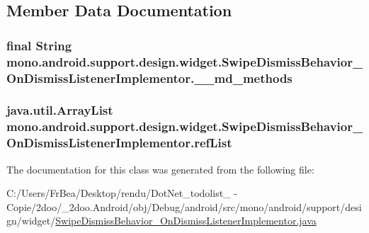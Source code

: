 \subsection{Member Data Documentation}
\hypertarget{classmono_1_1android_1_1support_1_1design_1_1widget_1_1_swipe_dismiss_behavior___on_dismiss_listener_implementor_74474e8db31efe7e1470f76275367cfe}{
\subsubsection[{\_\-\_\-md\_\-methods}]{\setlength{\rightskip}{0pt plus 5cm}final String {\bf mono.android.support.design.widget.SwipeDismissBehavior\_\-OnDismissListenerImplementor.\_\-\_\-md\_\-methods}}}
\label{classmono_1_1android_1_1support_1_1design_1_1widget_1_1_swipe_dismiss_behavior___on_dismiss_listener_implementor_74474e8db31efe7e1470f76275367cfe}


\hypertarget{classmono_1_1android_1_1support_1_1design_1_1widget_1_1_swipe_dismiss_behavior___on_dismiss_listener_implementor_38e4dd7bc6849d5a28ccc23f910a3dd5}{
\subsubsection[{refList}]{\setlength{\rightskip}{0pt plus 5cm}java.util.ArrayList {\bf mono.android.support.design.widget.SwipeDismissBehavior\_\-OnDismissListenerImplementor.refList}}}
\label{classmono_1_1android_1_1support_1_1design_1_1widget_1_1_swipe_dismiss_behavior___on_dismiss_listener_implementor_38e4dd7bc6849d5a28ccc23f910a3dd5}




The documentation for this class was generated from the following file:\begin{CompactItemize}
\item 
C:/Users/FrBea/Desktop/rendu/DotNet\_\-todolist\_ - Copie/2doo/\_\-2doo.Android/obj/Debug/android/src/mono/android/support/design/widget/\hyperlink{_swipe_dismiss_behavior___on_dismiss_listener_implementor_8java}{SwipeDismissBehavior\_\-OnDismissListenerImplementor.java}\end{CompactItemize}

